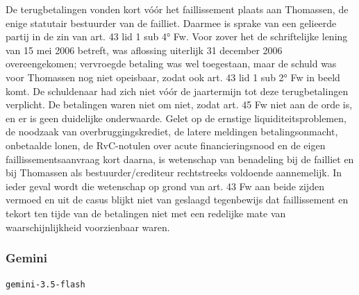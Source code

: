 \documentclass[
  dutch,
  a4paper,
]{article}
\begin{document}
De terugbetalingen vonden kort vóór het faillissement plaats aan Thomassen, de enige statutair bestuurder van de failliet. Daarmee is sprake van een gelieerde partij in de zin van art. 43 lid 1 sub 4° Fw. Voor zover het de schriftelijke lening van 15 mei 2006 betreft, was aflossing uiterlijk 31 december 2006 overeengekomen; vervroegde betaling was wel toegestaan, maar de schuld was voor Thomassen nog niet opeisbaar, zodat ook art. 43 lid 1 sub 2° Fw in beeld komt. De schuldenaar had zich niet vóór de jaartermijn tot deze terugbetalingen verplicht. De betalingen waren niet om niet, zodat art. 45 Fw niet aan de orde is, en er is geen duidelijke onderwaarde. Gelet op de ernstige liquiditeitsproblemen, de noodzaak van overbruggingskrediet, de latere meldingen betalingsonmacht, onbetaalde lonen, de RvC-notulen over acute financieringsnood en de eigen faillissementsaanvraag kort daarna, is wetenschap van benadeling bij de failliet en bij Thomassen als bestuurder/crediteur rechtstreeks voldoende aannemelijk. In ieder geval wordt die wetenschap op grond van art. 43 Fw aan beide zijden vermoed en uit de casus blijkt niet van geslaagd tegenbewijs dat faillissement en tekort ten tijde van de betalingen niet met een redelijke mate van waarschijnlijkheid voorzienbaar waren.

\newpage


\subsubsection{Gemini}\label{gemini-26}

\texttt{gemini-3.5-flash}
\end{document}

